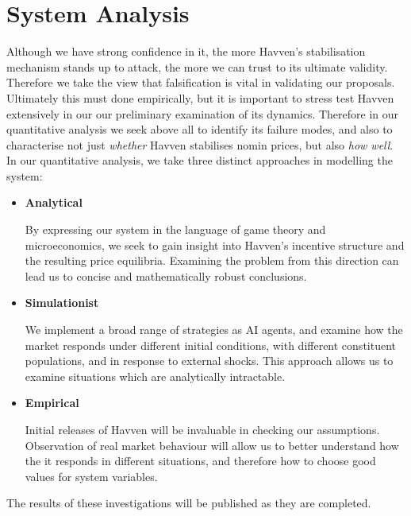 \section{System Analysis}

Although we have strong confidence in it, the more Havven's stabilisation mechanism
stands up to attack, the more we can trust to its ultimate validity.
Therefore we take the view that falsification is vital in validating our
proposals. \\

\noindent Ultimately this must done empirically, but it is important to stress test
Havven extensively in our our preliminary examination of its dynamics.
Therefore in our quantitative analysis we seek above all to identify its failure
modes, and also to characterise not just \textit{whether} Havven stabilises
nomin prices, but also \textit{how well}.\\

\noindent In our quantitative analysis, we take three distinct approaches in modelling the system:
\begin{itemize}
    \item[] \textbf{Analytical}
    
	By expressing our system in the language of game theory and microeconomics,
	we seek to gain insight into Havven's incentive structure and the resulting
	price equilibria. Examining the problem from this direction can lead us to
	concise and mathematically robust conclusions.

    \item[] \textbf{Simulationist}

    We implement a broad range of strategies as AI agents, and examine how the
    market responds under different initial conditions, with different constituent
	populations, and in response to external shocks. This approach allows us to
	examine situations which are analytically intractable.

    \item[] \textbf{Empirical}

    Initial releases of Havven will be invaluable in checking our assumptions.
    Observation of real market behaviour will allow us to better understand
    how the it responds in different situations, and therefore how to choose good values
    for system variables.
\end{itemize}

\noindent The results of these investigations will be published as they are completed.

